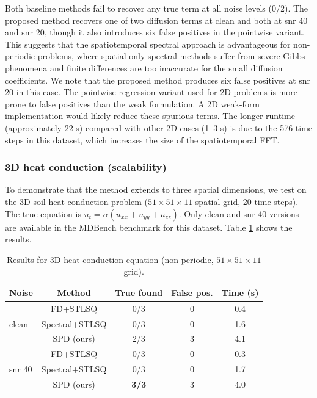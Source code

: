 \documentclass[preprint,12pt]{elsarticle}
\begin{document}
Both baseline methods fail to recover any true term at all noise levels (0/2). The proposed method recovers one of two diffusion terms at clean and both at snr 40 and snr 20, though it also introduces six false positives in the pointwise variant. This suggests that the spatiotemporal spectral approach is advantageous for non-periodic problems, where spatial-only spectral methods suffer from severe Gibbs phenomena and finite differences are too inaccurate for the small diffusion coefficients. We note that the proposed method produces six false positives at snr 20 in this case. The pointwise regression variant used for 2D problems is more prone to false positives than the weak formulation. A 2D weak-form implementation would likely reduce these spurious terms. The longer runtime (approximately 22 s) compared with other 2D cases (1--3 s) is due to the 576 time steps in this dataset, which increases the size of the spatiotemporal FFT.

\subsubsection{3D heat conduction (scalability)}

To demonstrate that the method extends to three spatial dimensions, we test on the 3D soil heat conduction problem ($51\times51\times11$ spatial grid, 20 time steps). The true equation is $u_t = \alpha(u_{xx}+u_{yy}+u_{zz})$. Only clean and snr 40 versions are available in the MDBench benchmark for this dataset. Table \ref{tab:3d} shows the results.

\begin{table}[H]
\centering
\caption{Results for 3D heat conduction equation (non-periodic, $51\times51\times11$ grid).}
\label{tab:3d}
\begin{tabular}{lcccc}
\toprule
Noise & Method & True found & False pos. & Time (s) \\
\midrule
\multirow{3}{*}{clean}
& FD+STLSQ & 0/3 & 0 & 0.4 \\
& Spectral+STLSQ & 0/3 & 0 & 1.6 \\
& SPD (ours) & 2/3 & 3 & 4.1 \\
\midrule
\multirow{3}{*}{snr 40}
& FD+STLSQ & 0/3 & 0 & 0.3 \\
& Spectral+STLSQ & 0/3 & 0 & 1.7 \\
& SPD (ours) & \textbf{3/3} & 3 & 4.0 \\
\bottomrule
\end{tabular}
\end{table}
\end{document}
